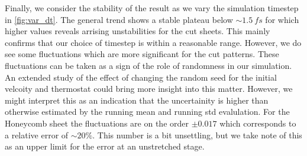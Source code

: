 Finally, we consider the stability of the result as we vary the simulation timestep in \cref{fig:var_dt}. The general trend shows a stable plateau below $\sim \SI{1.5}{fs}$ for which higher values reveals arrising unstabilities for the cut sheets. This mainly confirms that our choice of timestep is within a reasonable range. However, we do see some fluctuations which are more
significant for the cut patterns. These fluctuations can be taken as a sign of the role of randomness in our simulation. An extended study of the effect of changing the random seed for the initial velcoity and thermostat could bring more insight into this matter. However, we might interpret this as an indication that the uncertainity is higher than otherwise estimated by the running mean and running \acrshort{std} evalulation. For the Honeycomb sheet the fluctuations are on the order $\pm 0.017$ which corresponds to a relative error of $\sim 20\%$. This number is a bit unsettling, but we take note of this as an upper limit for the error at an unstretched stage. 








